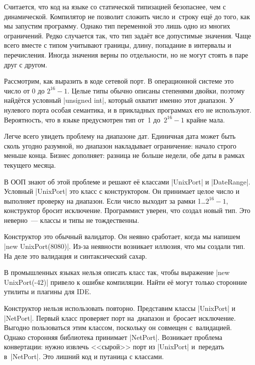 \label{type-and-pred}


Считается, что код на языке со статической типизацией безопаснее, чем с
динамической. Компилятор не позволит сложить число и~строку ещ\"{е} до того, как
мы запустим программу. Однако тип переменной это лишь одно из многих
ограничений. Редко случается так, что тип зада\"{е}т все допустимые
значения. Чаще всего вместе с типом учитывают границы, длину, попадание в
интервалы и перечисления. Иногда значения верны по отдельности, но не могут
стоять в паре друг с другом.


Рассмотрим, как выразить в коде сетевой порт. В операционной системе это число
от 0 до $2^{16}-1$. Целые типы обычно описаны степенями двойки, поэтому
найд\"{е}тся условный \spverb|unsigned int|, который охватит именно этот
диапазон. У нулевого порта особая семантика, и в прикладных программах его не
используют. Вероятность, что в языке предусмотрен тип от~1 до~$2^{16}-1$ крайне
мала.

Легче всего увидеть проблему на диапазоне дат. Единичная дата может быть сколь
угодно разумной, но диапазон накладывает ограничение: начало строго меньше
конца. Бизнес дополняет: разница не больше недели, обе даты в рамках текущего
месяца.


В ООП знают об этой проблеме и решают е\"{е} классами \spverb|UnixPort| и
\spverb|DateRange|. Условный \spverb|UnixPort| это класс с конструктором. Он
принимает целое число и выполняет проверку на диапазон. Если число выходит за
рамки 1\dots$2^{16}-1$, конструктор бросит исключение. Программист уверен, что
создал новый тип. Это неверно~--- классы и типы не тождественны.

Конструктор это обычный валидатор. Он неявно сработает, когда мы напишем
\spverb|new UnixPort(8080)|. Из-за неявности возникает иллюзия, что мы создали
тип. На деле это валидация и синтаксический сахар.


В промышленных языках нельзя описать класс так, чтобы выражение
\spverb|new UnixPort(-42)| привело к ошибке компиляции. Найти е\"{е} могут
только сторонние утилиты и плагины для IDE.

Конструктор нельзя использовать повторно. Представим классы \spverb|UnixPort| и
\spverb|NetPort|. Первый класс проверяет порт на~диапазон и~бросает
исключение. Выгодно пользоваться этим классом, поскольку он совмещен
с~валидацией. Однако сторонняя библиотека принимает \spverb|NetPort|. Возникает
проблема конвертации: нужно извлечь <<сырой>> порт из \spverb|UnixPort|
и~передать в~\spverb|NetPort|. Это лишний код и путаница с классами.

